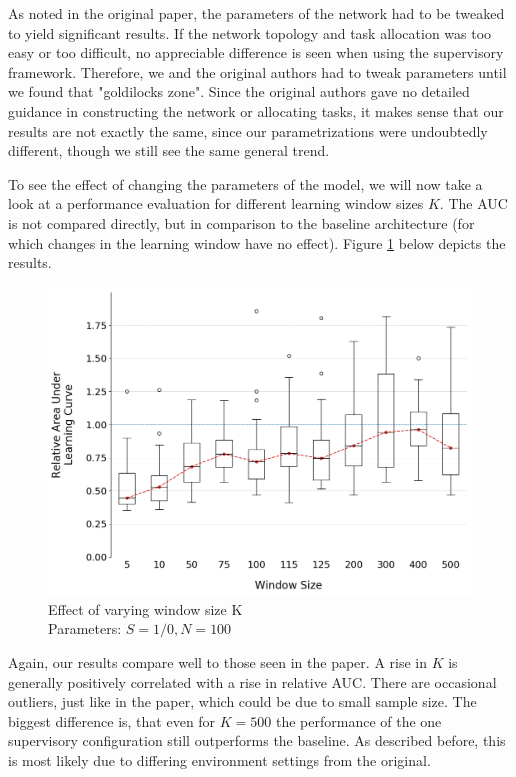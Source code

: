 \documentclass[letterpaper]{article}
\begin{document}
As noted in the original paper, the parameters of the network had to be tweaked to yield significant results.  If the network topology and task allocation was too easy or too difficult, no appreciable difference is seen when using the supervisory framework.  Therefore, we and the original authors had to tweak parameters until we found that "goldilocks zone".  Since the original authors gave no detailed guidance in constructing the network or allocating tasks, it makes sense that our results are not exactly the same, since our parametrizations were undoubtedly different, though we still see the same general trend.

To see the effect of changing the parameters of the model, we will now take a look at a performance evaluation for different learning window sizes $K$. The AUC is not compared directly, but in comparison to the baseline architecture (for which changes in the learning window have no effect). Figure \ref{fig:windows} below depicts the results.
\begin{figure}[H]
 \begin{center}
  \includegraphics[width=\linewidth]{figures/figure4_extended}
  \caption{Effect of varying window size K\\Parameters: $S=1/0,N=100$}
  \label{fig:windows}
 \end{center}
\end{figure}

Again, our results compare well to those seen in the paper. A rise in $K$ is generally positively correlated with a rise in relative AUC. There are occasional outliers, just like in the paper, which could be due to small sample size. The biggest difference is, that even for $K=500$ the performance of the one supervisory configuration still outperforms the baseline. As described before, this is most likely due to differing environment settings from the original.
\end{document}
